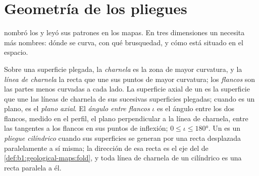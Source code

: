 \section{Geometría de los pliegues}\label{sec:b1:faults-folds-fabrics:folds}

 nombró los  y leyó sus patrones en los mapas. En tres dimensiones un  necesita
más nombres: dónde se curva, con qué brusquedad, y cómo está situado en el espacio.

\begin{definition}\label{def:b1:faults-folds-fabrics:fold-elements}
Sobre una superficie plegada, la \emph{charnela} es la zona de mayor curvatura, y la
\emph{línea de charnela} la recta que une sus puntos de mayor curvatura; los \emph{flancos} son las partes menos curvadas a cada lado. La superficie axial de un  es la superficie que une las líneas de
charnela de sus sucesivas superficies plegadas; cuando es un plano, es el \emph{plano axial}. El
\emph{ángulo entre flancos} $\iota$ es el ángulo entre los dos flancos, medido en el perfil, el plano
perpendicular a la línea de charnela, entre las tangentes a los flancos en sus puntos de inflexión;
$0 \le \iota \le \ang{180}$. Un  es un \emph{pliegue cilíndrico} cuando sus superficies se generan
por una recta desplazada paralelamente a sí misma; la dirección de esa recta es el eje del  de
\cref{def:b1:geological-maps:fold}, y toda línea de charnela de un  cilíndrico es una recta paralela a él.
\end{definition}


